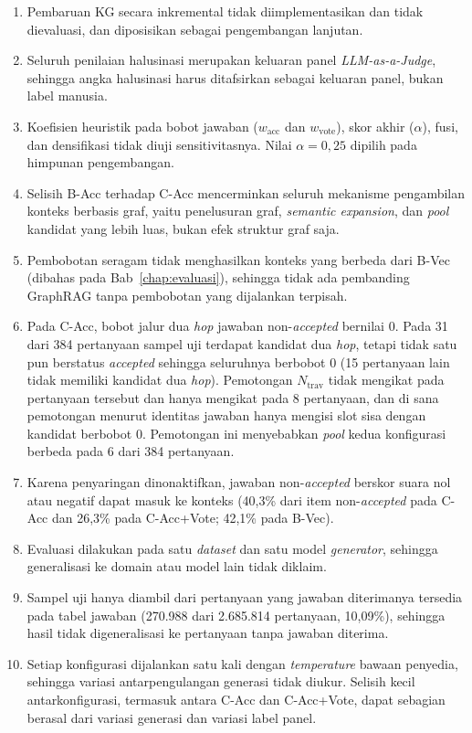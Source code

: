 \begin{enumerate}
    \item Pembaruan KG secara inkremental tidak diimplementasikan dan tidak dievaluasi, dan diposisikan sebagai pengembangan lanjutan.
    \item Seluruh penilaian halusinasi merupakan keluaran panel \emph{LLM-as-a-Judge}, sehingga angka halusinasi harus ditafsirkan sebagai keluaran panel, bukan label manusia. 
    \item Koefisien heuristik pada bobot jawaban ($w_{\mathrm{acc}}$ dan $w_{\mathrm{vote}}$), skor akhir ($\alpha$), fusi, dan densifikasi tidak diuji sensitivitasnya. Nilai $\alpha=0{,}25$ dipilih pada himpunan pengembangan.
    \item Selisih B-Acc terhadap C-Acc mencerminkan seluruh mekanisme pengambilan konteks berbasis graf, yaitu penelusuran graf, \emph{semantic expansion}, dan \emph{pool} kandidat yang lebih luas, bukan efek struktur graf saja. 
    \item Pembobotan seragam tidak menghasilkan konteks yang berbeda dari B-Vec (dibahas pada Bab~\ref{chap:evaluasi}), sehingga tidak ada pembanding GraphRAG tanpa pembobotan yang dijalankan terpisah.
    \item Pada C-Acc, bobot jalur dua \emph{hop} jawaban non-\emph{accepted} bernilai 0. Pada 31 dari 384 pertanyaan sampel uji terdapat kandidat dua \emph{hop}, tetapi tidak satu pun berstatus \emph{accepted} sehingga seluruhnya berbobot 0 (15 pertanyaan lain tidak memiliki kandidat dua \emph{hop}). Pemotongan $N_{\mathrm{trav}}$ tidak mengikat pada pertanyaan tersebut dan hanya mengikat pada 8 pertanyaan, dan di sana pemotongan menurut identitas jawaban hanya mengisi slot sisa dengan kandidat berbobot 0. Pemotongan ini menyebabkan \emph{pool} kedua konfigurasi berbeda pada 6 dari 384 pertanyaan.
    \item Karena penyaringan dinonaktifkan, jawaban non-\emph{accepted} berskor suara nol atau negatif dapat masuk ke konteks (40,3\% dari item non-\emph{accepted} pada C-Acc dan 26,3\% pada C-Acc+Vote; 42,1\% pada B-Vec).
    \item Evaluasi dilakukan pada satu \emph{dataset} dan satu model \emph{generator}, sehingga generalisasi ke domain atau model lain tidak diklaim.
    \item Sampel uji hanya diambil dari pertanyaan yang jawaban diterimanya tersedia pada tabel jawaban (270.988 dari 2.685.814 pertanyaan, 10,09\%), sehingga hasil tidak digeneralisasi ke pertanyaan tanpa jawaban diterima.
    \item Setiap konfigurasi dijalankan satu kali dengan \emph{temperature} bawaan penyedia, sehingga variasi antarpengulangan generasi tidak diukur. Selisih kecil antarkonfigurasi, termasuk antara C-Acc dan C-Acc+Vote, dapat sebagian berasal dari variasi generasi dan variasi label panel.
\end{enumerate}

